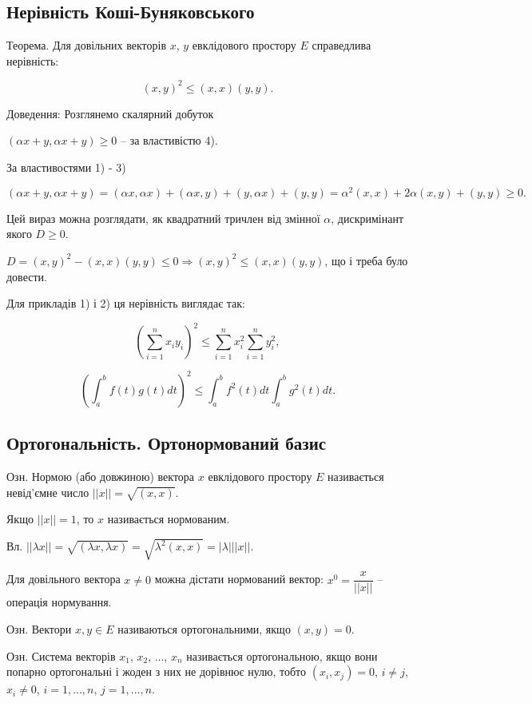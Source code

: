 \subsection*{Нерівність Коші-Буняковського}

Теорема. Для довільних векторів $x$, $y$ евклідового простору $E$
справедлива нерівність: 
 
$$(x,y)^2 \leqslant (x,x)(y,y).$$
 
Доведення: Розглянемо скалярний добуток

$(\alpha x + y, \alpha x + y) \geqslant 0$ -- за властивістю 4).

За властивостями 1) - 3)

$(\alpha x + y, \alpha x + y)
= (\alpha x, \alpha x) + (\alpha x,y) + (y, \alpha x) + (y,y)
= \alpha^2(x,x) + 2\alpha(x,y) + (y,y) \geqslant 0.$

Цей вираз можна розглядати, як квадратний тричлен від змінної $\alpha$,
дискримінант якого $D \geqslant 0$.

$D = (x,y)^2 - (x,x)(y,y) \leqslant 0 \Rightarrow  (x,y)^2 \leqslant (x,x)(y,y)$, що і треба було
довести.


Для прикладів 1) і 2) ця нерівність виглядає так:

$$\left( \sum\limits_{i=1}^n x_i y_i \right)^2  \leqslant \sum\limits_{i=1}^n x_i^2 \sum\limits_{i=1}^n y_i^2,$$

$$\left( \int_a^b f(t) g(t) dt \right)^2 \leqslant \int_a^b f^2(t) dt \int_a^b g^2(t) dt. $$

\subsection*{Ортогональність. Ортонормований базис}

Озн. Нормою (або довжиною) вектора $x$ евклідового простору $E$
називається невід’ємне число $||x|| = \sqrt{(x,x)}$.

Якщо $||x|| = 1$, то $x$ називається нормованим.

Вл. $||\lambda x||
= \sqrt{(\lambda x,\lambda x)}
= \sqrt{\lambda^2(x,x)}
= |\lambda| ||x||$.

Для довільного вектора $x \neq 0$ можна дістати нормований вектор:
$x^0 = \dfrac{x}{||x||}$ -- операція нормування.

Озн. Вектори $x, y \in E$ називаються ортогональними, якщо $(x, y) = 0$. 

Озн. Система векторів $x_1$, $x_2$, ..., $x_n$ називається ортогональною, якщо вони
попарно ортогональні і жоден з них не дорівнює нулю, тобто
$(x_i, x_j) = 0$, $i \neq j$, $x_i \neq 0$, $i = 1, ..., n$, $j = 1, ..., n$.

